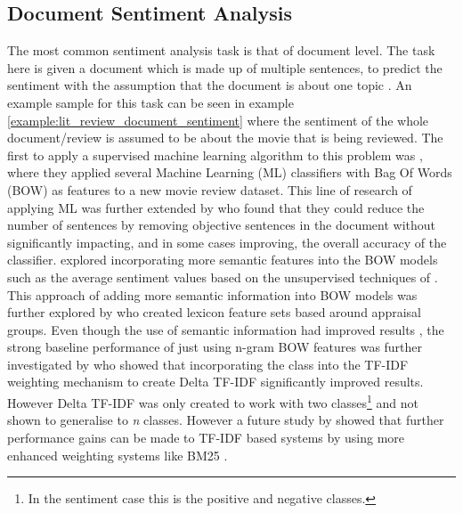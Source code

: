 \subsection{Document Sentiment Analysis}
The most common sentiment analysis task is that of document level. The task here is given a document which is made up of multiple sentences, to predict the sentiment with the assumption that the document is about one topic \citep{nasukawa2003sentiment}. An example sample for this task can be seen in example \ref{example:lit_review_document_sentiment} where the sentiment of the whole document/review is assumed to be about the movie that is being reviewed. The first to apply a supervised machine learning algorithm to this problem was \citet{pang-etal-2002-thumbs}, where they applied several Machine Learning (ML) classifiers with Bag Of Words (BOW) as features to a new movie review dataset. This line of research of applying ML was further extended by \citet{pang-lee-2004-sentimental} who found that they could reduce the number of sentences by removing objective sentences in the document without significantly impacting, and in some cases improving, the overall accuracy of the classifier. \citet{mullen-collier-2004-sentiment} explored incorporating more semantic features into the BOW models such as the average sentiment values based on the unsupervised techniques of \citet{turney-2002-thumbs}. This approach of adding more semantic information into BOW models was further explored by \citet{whitelaw2005using} who created lexicon feature sets based around appraisal groups. Even though the use of semantic information had improved results \citep{whitelaw2005using}, the strong baseline performance of just using n-gram BOW features was further investigated by \citet{martineau2009delta} who showed that incorporating the class into the TF-IDF weighting mechanism \citep{jones1972statistical} to create Delta TF-IDF significantly improved results. However Delta TF-IDF was only created to work with two classes\footnote{In the sentiment case this is the positive and negative classes.} and not shown to generalise to \textit{n} classes. However a future study by \citet{paltoglou-thelwall-2010-study} showed that further performance gains can be made to TF-IDF based systems by using more enhanced weighting systems like BM25 \citep{robertson1995okapi}.

